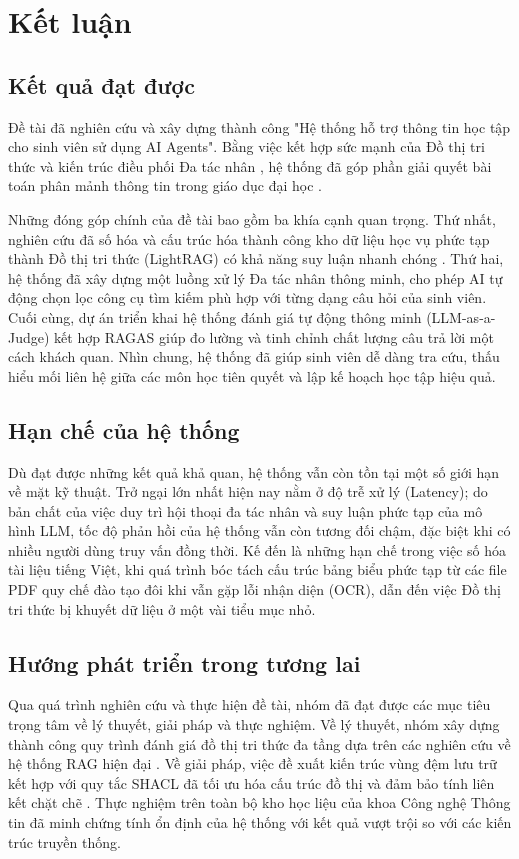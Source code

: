 \chapter{Kết luận}
\label{Chapter5}

\section{Kết quả đạt được}
Đề tài đã nghiên cứu và xây dựng thành công "Hệ thống hỗ trợ thông tin học tập cho sinh viên sử dụng AI Agents". Bằng việc kết hợp sức mạnh của Đồ thị tri thức \cite{hogan2021knowledge} và kiến trúc điều phối Đa tác nhân \cite{langgraph2024}, hệ thống đã góp phần giải quyết bài toán phân mảnh thông tin trong giáo dục đại học \cite{zawacki2019systematic}.

Những đóng góp chính của đề tài bao gồm ba khía cạnh quan trọng. Thứ nhất, nghiên cứu đã số hóa và cấu trúc hóa thành công kho dữ liệu học vụ phức tạp thành Đồ thị tri thức (LightRAG) có khả năng suy luận nhanh chóng \cite{guo2025lightrag}. Thứ hai, hệ thống đã xây dựng một luồng xử lý Đa tác nhân thông minh, cho phép AI tự động chọn lọc công cụ tìm kiếm phù hợp với từng dạng câu hỏi của sinh viên. Cuối cùng, dự án triển khai hệ thống đánh giá tự động thông minh (LLM-as-a-Judge) \cite{zheng2023judging} kết hợp RAGAS \cite{es2023ragas} giúp đo lường và tinh chỉnh chất lượng câu trả lời một cách khách quan. Nhìn chung, hệ thống đã giúp sinh viên dễ dàng tra cứu, thấu hiểu mối liên hệ giữa các môn học tiên quyết và lập kế hoạch học tập hiệu quả.

\section{Hạn chế của hệ thống}
Dù đạt được những kết quả khả quan, hệ thống vẫn còn tồn tại một số giới hạn về mặt kỹ thuật. Trở ngại lớn nhất hiện nay nằm ở độ trễ xử lý (Latency); do bản chất của việc duy trì hội thoại đa tác nhân \cite{wu2023autogen} và suy luận phức tạp của mô hình LLM, tốc độ phản hồi của hệ thống vẫn còn tương đối chậm, đặc biệt khi có nhiều người dùng truy vấn đồng thời. Kế đến là những hạn chế trong việc số hóa tài liệu tiếng Việt, khi quá trình bóc tách cấu trúc bảng biểu phức tạp từ các file PDF quy chế đào tạo đôi khi vẫn gặp lỗi nhận diện (OCR), dẫn đến việc Đồ thị tri thức bị khuyết dữ liệu ở một vài tiểu mục nhỏ.

\section{Hướng phát triển trong tương lai}
Qua quá trình nghiên cứu và thực hiện đề tài, nhóm đã đạt được các mục tiêu trọng tâm về lý thuyết, giải pháp và thực nghiệm. Về lý thuyết, nhóm xây dựng thành công quy trình đánh giá đồ thị tri thức đa tầng dựa trên các nghiên cứu về hệ thống RAG hiện đại \cite{lightrag, graphrag, dong2015kbt}. Về giải pháp, việc đề xuất kiến trúc vùng đệm lưu trữ kết hợp với quy tắc SHACL đã tối ưu hóa cấu trúc đồ thị và đảm bảo tính liên kết chặt chẽ \cite{shacl_w3c}. Thực nghiệm trên toàn bộ kho học liệu của khoa Công nghệ Thông tin đã minh chứng tính ổn định của hệ thống với kết quả vượt trội so với các kiến trúc truyền thống. 

